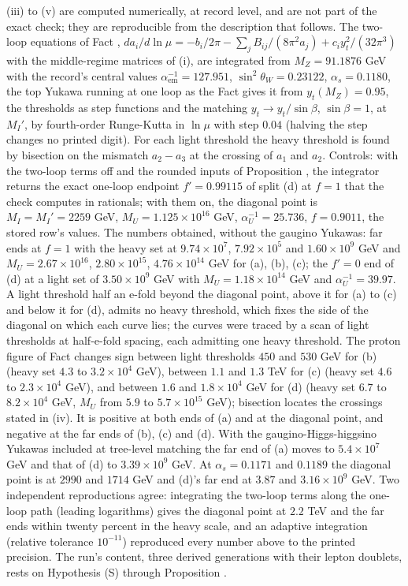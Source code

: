 (iii) to (v) are computed numerically, at record level, and are not part of the exact check; they are reproducible from the description that follows. The two-loop equations of Fact , $da_{i}/d\ln\mu = -b_{i}/2\pi - \sum_{j}B_{ij}/(8\pi^{2}a_{j}) + c_{i}y_{t}^{2}/(32\pi^{3})$ with the middle-regime matrices of (i), are integrated from $M_{Z} = 91.1876$ GeV with the record's central values $\alpha_{\mathrm{em}}^{-1} = 127.951$, $\sin^{2}\theta_{W} = 0.23122$, $\alpha_{s} = 0.1180$, the top Yukawa running at one loop as the Fact gives it from $y_{t}(M_{Z}) = 0.95$, the thresholds as step functions and the matching $y_{t} \to y_{t}/\sin\beta$, $\sin\beta = 1$, at $M_{I}'$, by fourth-order Runge-Kutta in $\ln\mu$ with step $0.04$ (halving the step changes no printed digit). For each light threshold the heavy threshold is found by bisection on the mismatch $a_{2} - a_{3}$ at the crossing of $a_{1}$ and $a_{2}$. Controls: with the two-loop terms off and the rounded inputs of Proposition , the integrator returns the exact one-loop endpoint $f' = 0.99115$ of split (d) at $f = 1$ that the check computes in rationals; with them on, the diagonal point is $M_{I} = M_{I}' = 2259$ GeV, $M_{U} = 1.125 \times 10^{16}$ GeV, $\alpha_{U}^{-1} = 25.736$, $f = 0.9011$, the stored row's values. The numbers obtained, without the gaugino Yukawas: far ends at $f = 1$ with the heavy set at $9.74 \times 10^{7}$, $7.92 \times 10^{5}$ and $1.60 \times 10^{9}$ GeV and $M_{U} = 2.67 \times 10^{16}$, $2.80 \times 10^{15}$, $4.76 \times 10^{14}$ GeV for (a), (b), (c); the $f' = 0$ end of (d) at a light set of $3.50 \times 10^{9}$ GeV with $M_{U} = 1.18 \times 10^{14}$ GeV and $\alpha_{U}^{-1} = 39.97$. A light threshold half an e-fold beyond the diagonal point, above it for (a) to (c) and below it for (d), admits no heavy threshold, which fixes the side of the diagonal on which each curve lies; the curves were traced by a scan of light thresholds at half-e-fold spacing, each admitting one heavy threshold. The proton figure of Fact  changes sign between light thresholds $450$ and $530$ GeV for (b) (heavy set $4.3$ to $3.2 \times 10^{4}$ GeV), between $1.1$ and $1.3$ TeV for (c) (heavy set $4.6$ to $2.3 \times 10^{4}$ GeV), and between $1.6$ and $1.8 \times 10^{4}$ GeV for (d) (heavy set $6.7$ to $8.2 \times 10^{4}$ GeV, $M_{U}$ from $5.9$ to $5.7 \times 10^{15}$ GeV); bisection locates the crossings stated in (iv). It is positive at both ends of (a) and at the diagonal point, and negative at the far ends of (b), (c) and (d). With the gaugino-Higgs-higgsino Yukawas included at tree-level matching the far end of (a) moves to $5.4 \times 10^{7}$ GeV and that of (d) to $3.39 \times 10^{9}$ GeV. At $\alpha_{s} = 0.1171$ and $0.1189$ the diagonal point is at $2990$ and $1714$ GeV and (d)'s far end at $3.87$ and $3.16 \times 10^{9}$ GeV. Two independent reproductions agree: integrating the two-loop terms along the one-loop path (leading logarithms) gives the diagonal point at $2.2$ TeV and the far ends within twenty percent in the heavy scale, and an adaptive integration (relative tolerance $10^{-11}$) reproduced every number above to the printed precision. The run's content, three derived generations with their lepton doublets, rests on Hypothesis (S) through Proposition .
